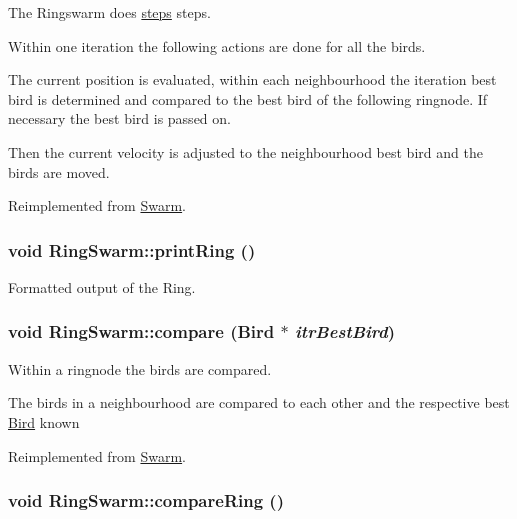 The Ringswarm does \hyperlink{runpso_8cpp_b4ae7205573977222eadd0795db193e2}{steps} steps. 

Within one iteration the following actions are done for all the birds.\par
 The current position is evaluated, within each neighbourhood the iteration best bird is determined and compared to the best bird of the following ringnode. If necessary the best bird is passed on. \par
 Then the current velocity is adjusted to the neighbourhood best bird and the birds are moved. 

Reimplemented from \hyperlink{classSwarm_7ab61f9797ce80e2edfb2bd881d7147c}{Swarm}.\hypertarget{classRingSwarm_747de173be4727e03eb584290f4d31d0}{
\subsubsection{\setlength{\rightskip}{0pt plus 5cm}void RingSwarm::printRing ()}}
\label{classRingSwarm_747de173be4727e03eb584290f4d31d0}


Formatted output of the Ring. 

\hypertarget{classRingSwarm_0c1b5e24190746a5880d95cf6dd16a15}{
\subsubsection{\setlength{\rightskip}{0pt plus 5cm}void RingSwarm::compare ({\bf Bird} $\ast$ {\em itrBestBird})}}
\label{classRingSwarm_0c1b5e24190746a5880d95cf6dd16a15}


Within a ringnode the birds are compared. 

The birds in a neighbourhood are compared to each other and the respective best \hyperlink{classBird}{Bird} known 

Reimplemented from \hyperlink{classSwarm_e0647f4af56497d936dafc35aa7989bf}{Swarm}.\hypertarget{classRingSwarm_37763e20c628ea4d47c2ddc5d0a2d985}{
\subsubsection{\setlength{\rightskip}{0pt plus 5cm}void RingSwarm::compareRing ()}}
\label{classRingSwarm_37763e20c628ea4d47c2ddc5d0a2d985}


